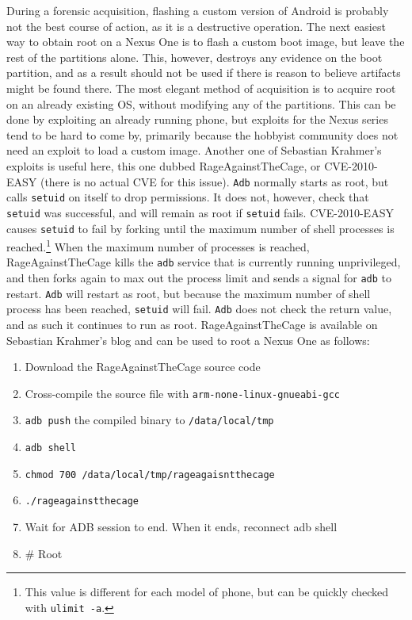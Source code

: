During a forensic acquisition, flashing a custom version of Android is probably not the best course of action, as it is a
destructive operation.  The next easiest way to obtain root on a Nexus One is to flash a custom boot image, but leave the rest of
the partitions alone.  This, however, destroys any evidence on the boot partition, and as a result should not be used if there is reason
to believe artifacts might be found there.  The most elegant method of acquisition is to acquire root on an already existing OS,
without modifying any of the partitions.  This can be done by exploiting an already running phone, but exploits for the Nexus series
tend to be hard to come by, primarily because the hobbyist community does not need an exploit to load a custom image.  Another one of
Sebastian Krahmer's exploits is useful here, this one dubbed RageAgainstTheCage, or CVE-2010-EASY (there is no actual CVE for this
issue).  \texttt{Adb} normally starts as root, but calls \texttt{setuid} on itself
to drop permissions.  It does not, however, check that \texttt{setuid} was successful, and will remain as root if \texttt{setuid}
fails.  CVE-2010-EASY causes \texttt{setuid} to fail by forking until the maximum number of shell processes is
reached.\footnote{This value is different for each model of phone, but can be quickly checked with \texttt{ulimit -a}.}  
When the maximum number of processes is reached, RageAgainstTheCage kills the \texttt{adb} service that is currently running
unprivileged, and then forks again to max out the process limit and sends a signal for \texttt{adb} to restart.  \texttt{Adb} will
restart as root, but because the maximum number of shell process has been reached, \texttt{setuid} will fail.  \texttt{Adb} does not
check the return value, and as such it continues to run as root.
RageAgainstTheCage is available on Sebastian Krahmer's blog and can be used to root a Nexus One as follows:
\begin{enumerate}
	\item Download the RageAgainstTheCage source code
	\item Cross-compile the source file with \texttt{arm-none-linux-gnueabi-gcc}
	\item \texttt{adb push} the compiled binary to \texttt{/data/local/tmp}
	\item \texttt{adb shell}
	\item \texttt{chmod 700 /data/local/tmp/rageagaisntthecage}
	\item \texttt{./rageagainstthecage}
	\item Wait for ADB session to end. When it ends, reconnect adb shell
	\item {\# Root}
\end{enumerate}	

